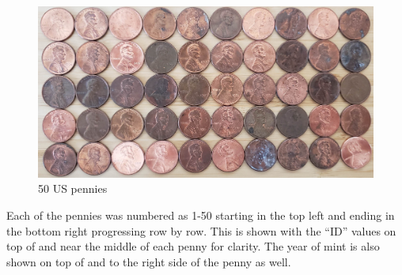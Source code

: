 \documentclass[12pt, krantz2,]{krantz}
\begin{document}
\begin{figure}

{\centering \includegraphics[width=1\linewidth]{images/sampling/pennies/pennies_trim} 

}

\caption{50 US pennies}\label{fig:unnamed-chunk-256}
\end{figure}

Each of the pennies was numbered as 1-50 starting in the top left and ending in the bottom right progressing row by row. This is shown with the ``ID'' values on top of and near the middle of each penny for clarity. The year of mint is also shown on top of and to the right side of the penny as well.
\end{document}
